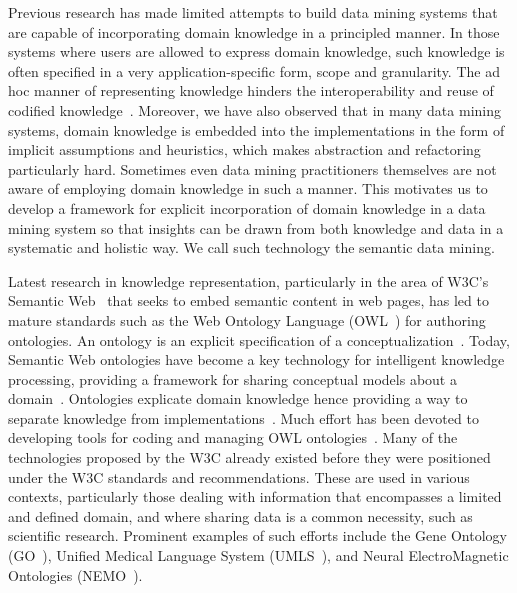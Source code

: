 Previous research has made limited attempts to build data mining systems that are capable of incorporating domain knowledge in a principled manner. In those systems where users are allowed to express domain knowledge, such knowledge is often specified in a very application-specific form, scope and granularity. The ad hoc manner of representing knowledge hinders the interoperability and reuse of codified knowledge~\cite{Pohle03}. Moreover, we have also observed that in many data mining systems, domain knowledge is embedded into the implementations in the form of implicit assumptions and heuristics, which makes abstraction and refactoring particularly hard. Sometimes even data mining practitioners themselves are not aware of employing domain knowledge in such a manner. This motivates us to develop a framework for explicit incorporation of domain knowledge in a data mining system so that insights can be drawn from both knowledge and data in a systematic and holistic way. We call such technology the semantic data mining.

Latest research in knowledge representation, particularly in the area of W3C's Semantic Web~\cite{Berners-Lee01} that seeks to embed semantic content in web pages, has led to mature standards such as the Web Ontology Language (OWL~\cite{OWL}) for authoring ontologies. An ontology is an explicit specification of a conceptualization~\cite{Gruber93}. Today, Semantic Web ontologies have become a key technology for intelligent knowledge processing, providing a framework for sharing conceptual models about a domain~\cite{Maedche03Onto}. Ontologies explicate domain knowledge hence providing a way to separate knowledge from implementations~\cite{Noy01ontologydevelopment}. Much effort has been devoted to developing tools for coding and managing OWL ontologies~\cite{Duineveld00, Knublauch04}. Many of the technologies proposed by the W3C already existed before they were positioned under the W3C standards and recommendations. These are used in various contexts, particularly those dealing with information that encompasses a limited and defined domain, and where sharing data is a common necessity, such as scientific research. Prominent examples of such efforts include the Gene Ontology (GO~\cite{GO}), Unified Medical Language System (UMLS~\cite{UMLS}), and Neural ElectroMagnetic Ontologies (NEMO~\cite{FrishkoffEtal07, FrishkoffEtal09}).


